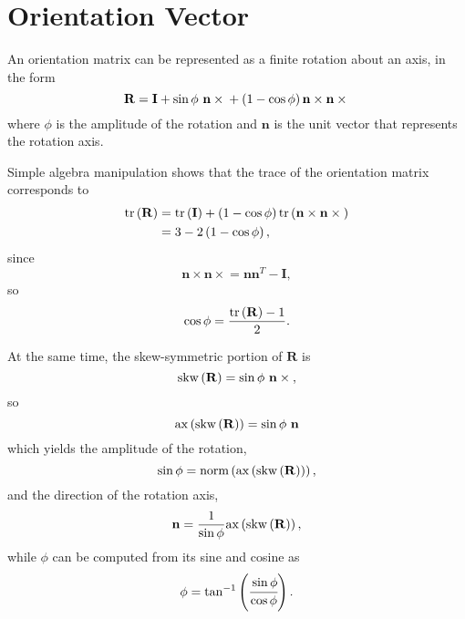 \documentclass[10pt,dvips,fleqn,subeqn]{report}
\newcommand{\T}[1]{\bm{\mathbf{#1}}}
\begin{document}
\section{Orientation Vector}
An orientation matrix can be represented as a finite rotation about 
an axis, in the form
\begin{equation}
	\T{R} = \T{I}
	+ \sin\phi \ \T{n}\times{}
	+ \plbr{1 - \cos\phi} \T{n}\times\T{n}\times{}
\end{equation}
where $\phi$ is the amplitude of the rotation and $\T{n}$ 
is the unit vector that represents the rotation axis.

Simple algebra manipulation shows that the trace of the orientation matrix
corresponds to 
\begin{align}
	\mathrm{tr}\plbr{\T{R}}
	&= \mathrm{tr}\plbr{\T{I}}
	+ \plbr{1 - \cos\phi}\mathrm{tr}\plbr{\T{n}\times\T{n}\times{}} \\
	&= 3 - 2 \plbr{1 - \cos\phi} ,
\end{align}
since
\begin{equation}
	\T{n}\times\T{n}\times{} = \T{n} \T{n}^T - \T{I} ,
\end{equation}
so
\begin{equation}
	\cos\phi = \frac{\mathrm{tr}\plbr{\T{R}} - 1}{2} .
\end{equation}

At the same time, the skew-symmetric portion of $\T{R}$ is
\begin{equation}
	\mathrm{skw}\plbr{\T{R}} = \sin\phi \ \T{n}\times{} ,
\end{equation}
so
\begin{equation}
	\mathrm{ax}\plbr{\mathrm{skw}\plbr{\T{R}}} = \sin\phi \ \T{n}
\end{equation}
which yields the amplitude of the rotation,
\begin{equation}
	\sin\phi
	= \mathrm{norm}\plbr{\mathrm{ax}\plbr{\mathrm{skw}\plbr{\T{R}}}} ,
\end{equation}
and the direction of the rotation axis,
\begin{equation}
	\T{n} = \frac{1}{\sin\phi}\mathrm{ax}\plbr{\mathrm{skw}\plbr{\T{R}}} ,
\end{equation}
while $\phi$ can be computed from its sine and cosine as
\begin{equation}
	\phi = \tan^{-1}\left( \cfrac{\sin\phi}{\cos\phi} \right) .
\end{equation}
\end{document}
